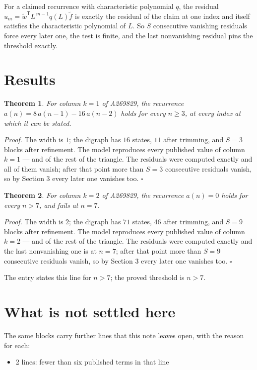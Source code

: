 \documentclass[11pt]{article}
\newtheorem{theorem}{Theorem}
\theoremstyle{definition}
\begin{document}
For a claimed recurrence with characteristic polynomial $q$, the residual $u_m = \tilde w^{\mathsf T}L^{\,m-1}q(L)\tilde f$ is exactly the residual of the claim at one index and itself satisfies the characteristic polynomial of $L$. So $S$ consecutive vanishing residuals force every later one, the test is finite, and the last nonvanishing residual pins the threshold exactly.

\section{Results}

\begin{theorem} For column $k = 1$ of A269829, the recurrence $a(n) = 8\,a(n-1) - 16\,a(n-2)$ holds for every $n \ge 3$, at every index at which it can be stated.\end{theorem}

{\itshape Proof.} The width is $1$; the digraph has $16$ states, $11$ after trimming, and $S = 3$ blocks after refinement. The model reproduces every published value of column $k = 1$ --- and of the rest of the triangle. The residuals were computed exactly and all of them vanish; after that point more than $S = 3$ consecutive residuals vanish, so by Section 3 every later one vanishes too. $\square$

\begin{theorem} For column $k = 2$ of A269829, the recurrence $a(n) = 0$ holds for every $n > 7$, and fails at $n = 7$.\end{theorem}

{\itshape Proof.} The width is $2$; the digraph has $71$ states, $46$ after trimming, and $S = 9$ blocks after refinement. The model reproduces every published value of column $k = 2$ --- and of the rest of the triangle. The residuals were computed exactly and the last nonvanishing one is at $n = 7$; after that point more than $S = 9$ consecutive residuals vanish, so by Section 3 every later one vanishes too. $\square$

The entry states this line for $n > 7$; the proved threshold is $n > 7$.

\section{What is not settled here}

The same blocks carry further lines that this note leaves open, with the reason for each:

\begin{itemize}

\item 2 lines: fewer than six published terms in that line

\end{itemize}
\end{document}
